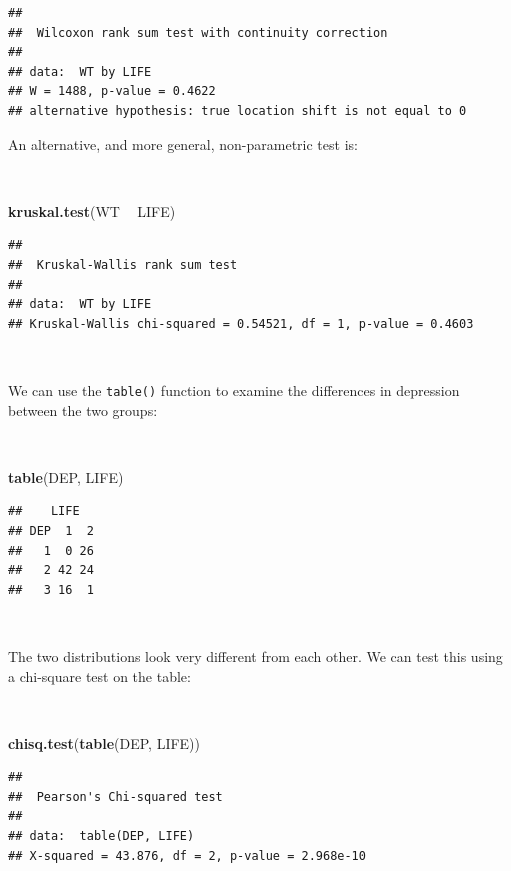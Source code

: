 \documentclass[12pt,a4paper]{book}
\newenvironment{Shaded}{\begin{snugshade}}{\end{snugshade}}
\newcommand{\KeywordTok}[1]{\textcolor[rgb]{0.13,0.29,0.53}{\textbf{#1}}}
\newcommand{\NormalTok}[1]{#1}
\newcommand{\OperatorTok}[1]{\textcolor[rgb]{0.81,0.36,0.00}{\textbf{#1}}}
\newcommand{\StringTok}[1]{\textcolor[rgb]{0.31,0.60,0.02}{#1}}
\theoremstyle{definition}
\theoremstyle{definition}
\theoremstyle{definition}
\theoremstyle{remark}
\begin{document}
\begin{verbatim}
## 
##  Wilcoxon rank sum test with continuity correction
## 
## data:  WT by LIFE
## W = 1488, p-value = 0.4622
## alternative hypothesis: true location shift is not equal to 0
\end{verbatim}

\newpage

An alternative, and more general, non-parametric test is:

~

\begin{Shaded}
\begin{Highlighting}[]
\KeywordTok{kruskal.test}\NormalTok{(WT }\OperatorTok{~}\StringTok{ }\NormalTok{LIFE)}
\end{Highlighting}
\end{Shaded}

\begin{verbatim}
## 
##  Kruskal-Wallis rank sum test
## 
## data:  WT by LIFE
## Kruskal-Wallis chi-squared = 0.54521, df = 1, p-value = 0.4603
\end{verbatim}

~

We can use the \texttt{table()} function to examine the differences in
depression between the two groups:

~

\begin{Shaded}
\begin{Highlighting}[]
\KeywordTok{table}\NormalTok{(DEP, LIFE)}
\end{Highlighting}
\end{Shaded}

\begin{verbatim}
##    LIFE
## DEP  1  2
##   1  0 26
##   2 42 24
##   3 16  1
\end{verbatim}

~

The two distributions look very different from each other. We can test
this using a chi-square test on the table:

~

\begin{Shaded}
\begin{Highlighting}[]
\KeywordTok{chisq.test}\NormalTok{(}\KeywordTok{table}\NormalTok{(DEP, LIFE))}
\end{Highlighting}
\end{Shaded}

\begin{verbatim}
## 
##  Pearson's Chi-squared test
## 
## data:  table(DEP, LIFE)
## X-squared = 43.876, df = 2, p-value = 2.968e-10
\end{verbatim}
\end{document}
